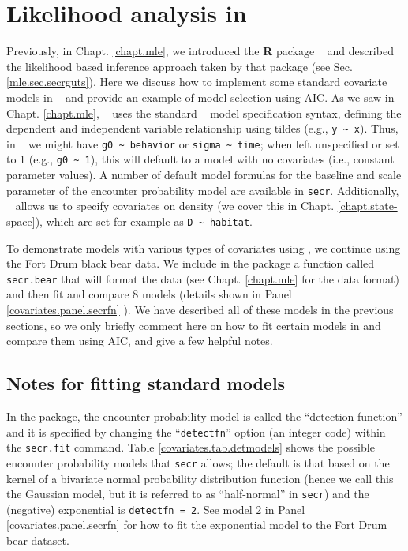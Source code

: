 \section{Likelihood analysis in \secr}
\label{likelihood.secr}

Previously, in Chapt. \ref{chapt.mle}, we introduced the {\bf R}
package \secr~ and described the likelihood based inference approach taken
by that package (see Sec. \ref{mle.sec.secrguts}).  Here we discuss how
to implement some standard covariate models in \secr~ and provide an
example of model selection using AIC.   As we saw in
Chapt. \ref{chapt.mle}, \secr~ uses the standard \R~ model
specification syntax, defining the dependent and independent
variable relationship using tildes (e.g., \Verb+y ~ x+).  Thus, in
\secr~ we might have \verb+g0 ~ behavior+ or
\verb+sigma ~ time+; when left unspecified or set to 1 (e.g.,
\verb+g0 ~ 1+), this will default to a model with no covariates (i.e.,
constant parameter values).  A number of default model formulas for
the baseline and scale parameter of the encounter probability model
are available in \mbox{\tt secr}.
Additionally, \secr~ allows us to specify
covariates on density (we cover this in
Chapt. \ref{chapt.state-space}), which are set for
example as \verb+D ~ habitat+.

To demonstrate
 models with various types of covariates using \secr, we
continue using the Fort Drum black bear data. 
We include in the \scrbook package a function called {\tt secr.bear}
that will format the data (see Chapt. \ref{chapt.mle} for the \secr
data format) and then fit and compare 8 models (details shown in Panel
\ref{covariates.panel.secrfn} ).  We have described all of these
models in the previous sections, so we only briefly comment here on
how to fit certain models in \secr and compare them using AIC, and
give a few helpful notes.

\subsection{Notes for fitting standard models}

In the \secr package, the encounter probability model is called the
``detection function'' and it is specified 
by changing the ``\mbox{\tt detectfn}'' option (an integer code)
within the \mbox{\tt secr.fit} command.  Table
\ref{covariates.tab.detmodels} shows the possible encounter
probability models 
that \mbox{\tt secr} allows; the default is that based on the kernel
of a bivariate normal probability distribution function
(hence we call this the Gaussian model, but it is referred to as
``half-normal'' 
in \mbox{\tt secr}) and the
(negative) exponential is \mbox{\tt detectfn = 2}.  See model 2 in 
Panel \ref{covariates.panel.secrfn} for how to fit the exponential 
model to the Fort Drum bear dataset. 

